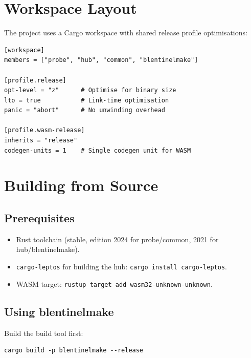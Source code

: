 \documentclass[12pt]{report}
\begin{document}
\section{Workspace Layout}

The project uses a Cargo workspace with shared release profile optimisations:

\begin{lstlisting}
[workspace]
members = ["probe", "hub", "common", "blentinelmake"]

[profile.release]
opt-level = "z"      # Optimise for binary size
lto = true           # Link-time optimisation
panic = "abort"      # No unwinding overhead

[profile.wasm-release]
inherits = "release"
codegen-units = 1    # Single codegen unit for WASM
\end{lstlisting}

\section{Building from Source}

\subsection{Prerequisites}

\begin{itemize}
    \item Rust toolchain (stable, edition 2024 for probe/common, 2021 for
          hub/blentinelmake).
    \item \texttt{cargo-leptos} for building the hub:
          \texttt{cargo install cargo-leptos}.
    \item WASM target: \texttt{rustup target add wasm32-unknown-unknown}.
\end{itemize}

\subsection{Using blentinelmake}

Build the build tool first:

\begin{lstlisting}
cargo build -p blentinelmake --release
\end{lstlisting}
\end{document}
